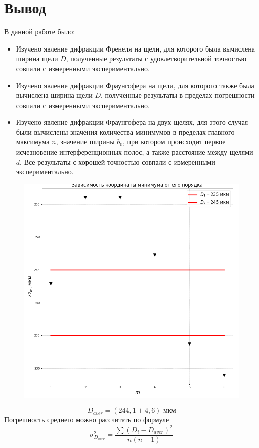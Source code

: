 \documentclass[a4paper,12pt]{article}
\begin{document}
\newpage
\section{Вывод}
В данной работе было:
\begin{itemize}
    \item Изучено явление дифракции Френеля на щели, для которого была вычислена ширина щели $D$, полученные результаты с удовлетворительной точностью совпали с измеренными экспериментально. 

    \item Изучено явление дифракции Фраунгофера на щели, для которого также была вычислена ширина щели $D$, полученные результаты в пределах погрешности совпали с измеренными экспериментально. 

    \item Изучено явление дифракции Фраунгофера на двух щелях, для этого случая были вычислены значения количества минимумов в пределах главного максимума $n$, значение ширины $b_0$, при котором происходит первое исчезновение
    интерференционных полос, а также расстояние между щелями $d$. Все результаты с хорошей точностью совпали с измеренными экспериментально.
    
\end{itemize}

\newpage
\begin{figure}[H]\label{fig: Fraunhofer, 2z(m)}
    \centering
    \includegraphics[width = \textwidth]{2z(m).png}
\end{figure}
\[D_{aver} = (244,1 \pm 4,6)\text{ мкм}\]
Погрешность среднего можно рассчитать по формуле
\[\sigma_{D_{aver}}^2 = \frac{\sum (D_i - D_{aver})^2}{n(n-1)}\]
\end{document}
